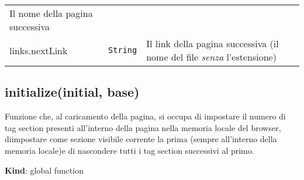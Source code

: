 \begin{tabularx}{\textwidth}{XXX}
\begin{minipage}[t]{0.30\columnwidth}
Il nome della pagina successiva\strut
\end{minipage}\tabularnewline
\begin{minipage}[t]{0.30\columnwidth}\raggedright
links.nextLink\strut
\end{minipage} & \begin{minipage}[t]{0.30\columnwidth}\raggedright
\texttt{String}\strut
\end{minipage} & \begin{minipage}[t]{0.30\columnwidth}\raggedright
Il link della pagina successiva (il nome del file \emph{senza}
l'estensione)\strut
\end{minipage}\tabularnewline
\bottomrule
\end{tabularx}

\protect\hypertarget{initialize}{}{}

\hypertarget{initializeinitial-base}{%
\subsection{initialize(initial, base)}\label{initializeinitial-base}}

Funzione che, al caricamento della pagina, si occupa di impostare il
numero di tag section presenti all'interno della pagina nella memoria
locale del browser, diimpostare come sezione visibile corrente la prima
(sempre all'interno della memoria locale)e di nascondere tutti i tag
section successivi al primo.

\textbf{Kind}: global function

